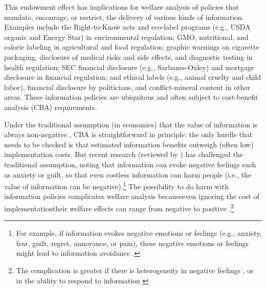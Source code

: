
This endowment effect has implications for welfare analysis of policies that mandate, encourage, or restrict, the delivery of various kinds of information. Examples include the Right-to-Know acts and eco-label programs (e.g., USDA organic and Energy Star) in environmental regulation; GMO, nutritional, and calorie labeling in agricultural and food regulation; graphic warnings on cigarette packaging, disclosure of medical risks and side effects, and diagnostic testing in health regulation; SEC financial disclosure (e.g., Sarbanes-Oxley) and mortgage disclosure in financial regulation; and ethical labels (e.g., animal cruelty and child labor), financial disclosure by politicians, and conflict-mineral content in other areas. These information policies are ubiquitous and often subject to cost-benefit analysis (CBA) requirements.

Under the traditional assumption (in economics) that the value of information is always non-negative \citep{stiglerEconomicsInformation1961}, CBA is straightforward in principle: the only hurdle that needs to be checked is that estimated information benefits outweigh (often low) implementation costs. But recent research (reviewed by \citet{golmanInformationAvoidance2017}) has challenged the traditional assumption, noting that information can evoke negative feelings such as anxiety or guilt, so that even costless information can harm people (i.e., the value of information can be negative).\footnote{For example, if information evokes negative emotions or feelings (e.g., anxiety, fear, guilt, regret, annoyance, or pain), these negative emotions or feelings might lead to information avoidance \citep{koszegiHealthAnxietyPatient2003,danaExploitingMoralWiggle2007,karlssonOstrichEffectSelective2009,sweenyInformationAvoidanceWho2010,osterOptimalExpectationsLimited2013,grossmanStrategicIgnoranceRobustness2014,hertwigHomoIgnoransDeliberately2016,onwezenWhenIndifferenceAmbivalence2016,savolainenApproachingAffectiveBarriers2016,thunstromStrategicSelfignorance2016,grossmanSelfImageWillfulIgnorance2017,damgaardHiddenCostsNudging2018,thunstromEndogenousAttentionCosts2019,sunsteinRuiningPopcornWelfare2019}.} The possibility to do harm with information policies complicates welfare analysis because\textemdash even ignoring the cost of implementation\textemdash their welfare effects can range from negative to positive \citep{damgaardHiddenCostsNudging2018, allcottWelfareEffectsNudges2019,buteraDeadweightLossSocial2019,rafiqHowMuchCalorieundefined/ed,thunstromWelfareEffectsNudges2020}.\footnote{The complication is greater if there is heterogeneity in negative feelings \citep{sunsteinRuiningPopcornWelfare2019}, or in the ability to respond to information \citep{robertsNudgeProofDistributiveJustice2018}}

